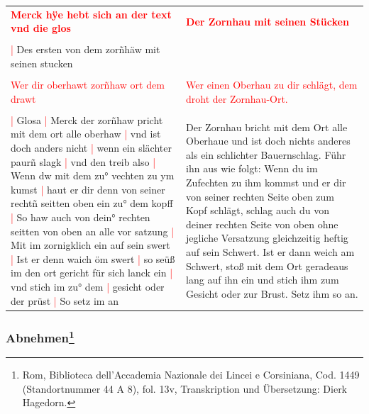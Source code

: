 \begin{longtable}{p{6.25cm}p{6.25cm}}
    \textbf{\textcolor{red}{
        Merck hÿe hebt sich an der text vnd die glos}}
    &
    \textbf{\textcolor{red}{
        Der Zornhau mit seinen Stücken}}
    \\
    \\
    \textcolor{red}{|} Des ersten von dem zorñhäw mit seinen stucken
    &

    \\
    \\
    \textcolor{red}{
        Wer dir oberhawt zorñhaw ort dem drawt}
    &
    \textcolor{red}{
        Wer einen Oberhau zu dir schlägt, dem droht der Zornhau-Ort.}
    \\
    \\
    \textcolor{red}{|} Glosa
    \textcolor{red}{|} Merck der zorñhaw pricht mit dem ort alle oberhaw
    \textcolor{red}{|} vnd ist doch anders nicht
    \textcolor{red}{|} wenn ein slächter paurñ slagk
    \textcolor{red}{|} vnd den treib also
    \textcolor{red}{|} Wenn dw mit dem zu° vechten zu ym kumst
    \textcolor{red}{|} haut er dir denn von seiner rechtñ seitten oben ein zu° dem kopff
    \textcolor{red}{|} So haw auch von dein° rechten seitten von oben an alle vor satzung
    \textcolor{red}{|} Mit im zornigklich ein auf sein swert
    \textcolor{red}{|} Ist er denn waich öm swert
    \textcolor{red}{|} so seüß im den ort gericht für sich lanck ein
    \textcolor{red}{|} vnd stich im zu° dem
    \textcolor{red}{|} gesicht oder der prüst
    \textcolor{red}{|} So setz im an
    &
    Der Zornhau bricht mit dem Ort alle Oberhaue und ist doch nichts anderes als ein schlichter Bauernschlag.
    Führ ihn aus wie folgt: Wenn du im Zufechten zu ihm kommst und er dir von seiner rechten Seite oben zum Kopf schlägt, schlag auch du von deiner rechten Seite von oben ohne jegliche Versatzung gleichzeitig heftig auf sein Schwert.
    Ist er dann weich am Schwert, stoß mit dem Ort geradeaus lang auf ihn ein und stich ihm zum Gesicht oder zur Brust.
    Setz ihm so an.
\end{longtable}

\newpage

\begin{center}
\end{center}

\newpage

\subsubsection[Abnehmen]{
    Abnehmen\footnote{
        \hspace*{0.5ex}Rom, Biblioteca dell'Accademia Nazionale dei Lincei e Corsiniana,
        Cod. 1449 (Standortnummer 44 A 8), fol. 13v, Transkription und Übersetzung: Dierk Hagedorn.}}

